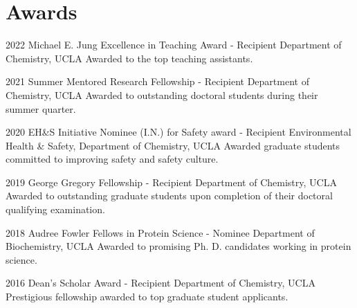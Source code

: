 \section{Awards}

\begin{entrylist}
\entry
{2022}
{Michael E. Jung Excellence in Teaching Award - Recipient}
{Department of Chemistry, UCLA}
{Awarded to the top teaching assistants.}

\entry
{2021}
{Summer Mentored Research Fellowship - Recipient}
{Department of Chemistry, UCLA}
{Awarded to outstanding doctoral students during their summer quarter.}

\entry
{2020}
{EH\&S Initiative Nominee (I.N.) for Safety award - Recipient}
{Environmental Health \& Safety, Department of Chemistry, UCLA}
{Awarded graduate students committed to improving safety and safety culture.}

\entry
{2019}
{George Gregory Fellowship - Recipient}
{Department of Chemistry, UCLA}
{Awarded to outstanding graduate students upon completion of their doctoral qualifying examination.}

\entry
{2018}
{Audree Fowler Fellows in Protein Science - Nominee}
{Department of Biochemistry, UCLA}
{Awarded to promising Ph. D. candidates working in protein science.}

\entry
{2016}
{Dean's Scholar Award - Recipient}
{Department of Chemistry, UCLA}
{Prestigious fellowship awarded to top graduate student applicants.}

\end{entrylist}